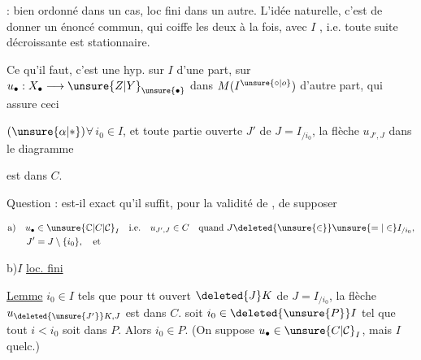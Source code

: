 
 : bien ordonné dans un cas, loc fini dans un autre. L'idée naturelle, c'est de  donner un énoncé commun, qui coiffe les deux à la fois, avec $I$ , i.e. toute suite décroissante est stationnaire.

Ce qu'il faut, c'est une hyp. sur $I$ d'une part, sur $u_\bullet:X_\bullet\longrightarrow \unsure{Z|Y}_{\unsure{\bullet}}$ dans $M(I^{\unsure{\circ|o}})$ d'autre part, qui assure ceci

$(\unsure{\alpha|*})$\qquad $\forall\,i_0\in I$, et toute partie ouverte $J'$ de $J=I_{/i_0}$, la flèche $u_{J',J}$ dans le diagramme


est dans $C$.

Question : est-il exact qu'il suffit, pour la validité de \unsure{$\alpha$}, de supposer

\[
\begin{aligned}
&\text{a)}\quad u_\bullet\in \unsure{\mathbb C|C|\mathcal C}_I \quad\text{i.e.}\quad u_{J',J}\in C
 \quad \text{quand } J\deleted{\unsure{\in}}\unsure{=|\in}I_{/i_0},\\
&\qquad J'=J\setminus\{i_0\},\quad\text{et}
\end{aligned}
\]

b)\quad $I$ \uline{loc. fini} 



\uline{Lemme}   $i_0\in I$ tels que pour tt ouvert $\deleted{J}K$ de $J=I_{/i_0}$, la flèche $u_{\deleted{\unsure{J'}}K,J}$ est dans $C$.   soit $i_0\in\deleted{\unsure{P}}I$ tel que tout $i<i_0$ soit dans $P$. Alors $i_0\in P$. (On suppose $u_\bullet\in \unsure{C|\mathcal C}_I$, mais $I$ quelc.)

